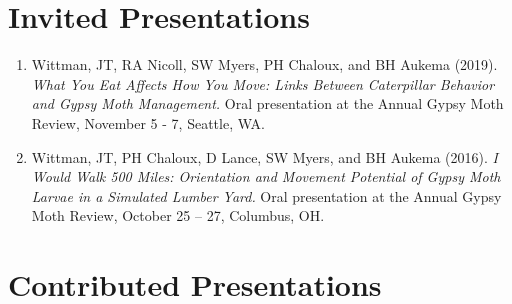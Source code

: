 \documentclass[11pt, a4paper]{awesome-cv}
\providecommand{\tightlist}{%
	\setlength{\itemsep}{0pt}\setlength{\parskip}{0pt}}
\begin{document}
\nocite{Short,
Wittman2019,
Stivers2019,
Wittman2018,
Wittman2017,
Wittman2013}

\hypertarget{invited-presentations}{%
\section{Invited Presentations}\label{invited-presentations}}

\begin{enumerate}
\def\labelenumi{\arabic{enumi}.}
\tightlist
\item
  Wittman, JT, RA Nicoll, SW Myers, PH Chaloux, and BH Aukema (2019). \emph{What You Eat Affects How You Move: Links Between Caterpillar Behavior and Gypsy Moth Management.} Oral presentation at the Annual Gypsy Moth Review, November 5 - 7, Seattle, WA.
\item
  Wittman, JT, PH Chaloux, D Lance, SW Myers, and BH Aukema (2016). \emph{I Would Walk 500 Miles: Orientation and Movement Potential of Gypsy Moth Larvae in a Simulated Lumber Yard.} Oral presentation at the Annual Gypsy Moth Review, October 25 -- 27, Columbus, OH.
\end{enumerate}

\hypertarget{contributed-presentations}{%
\section{Contributed Presentations}\label{contributed-presentations}}
\end{document}
